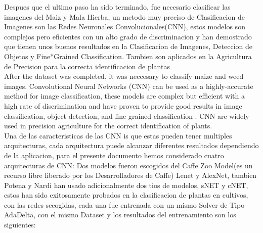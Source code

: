 \documentclass[conference]{IEEEtran}
\begin{document}
Despues que el ultimo paso ha sido terminado, fue necesario clasificar las imagenes del Maiz y Mala Hierba, un metodo muy preciso de Clasificacion de Imagenes son las Redes Neuronales Convolucionales(CNN), estos modelos son complejos pero eficientes  con un alto grado de discriminacion y han demostrado que tienen unos buenos resultados en la Clasificacion de Imagenes, Deteccion de Objetos y Fine*Grained Classification. Tambien son aplicados en la Agricultura de Precision para la correcta identificacion de plantas\\

	After the dataset was completed, it was neccesary to classify maize and weed images. Convolutional Neural Networks (CNN) can be used as a highly-accurate method for image classification, these models are complex but efficient with a high rate of discrimination and have proven to provide good results in image classification, object detection, and fine-grained  classification \cite{sharif2014cnn}. CNN are widely used in precision agriculture \cite{potena2016fast} for the correct identification of plants.\\
	
	 
Una de las caracteristicas de las CNN is que estas pueden tener multiples arquitecturas, cada arquitectura puede alcanzar diferentes resultados dependiendo de la aplicacion, para el presente documento hemos considerado cuatro arquitecturas de CNN: Dos modelos fueron escogidos del Caffe Zoo Model(es un recurso libre liberado por los Desarrolladores de Caffe) Lenet y AlexNet, tambien Potena y Nardi han usado adicionalmente dos tios de modelos, sNET y cNET, estos han sido exitosamente probados en la clasificacion de plantas en cultivos, con las redes secogidas, cada una fue entrenada con un mismo Solver de Tipo AdaDelta, con el mismo Dataset y los resultados del entrenamiento son los siguientes: \\
\end{document}
